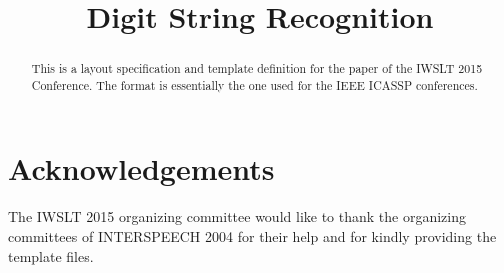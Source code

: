 \documentclass[a4paper]{article}
\title{Digit String Recognition}
\begin{document}
\maketitle
%
\begin{abstract}
This is a layout specification and template
definition for the paper of the IWSLT 2015 Conference. 
The format is essentially the one used for the IEEE ICASSP conferences.
\end{abstract}


%








\section{Acknowledgements}
The IWSLT 2015 organizing committee would like to thank the
organizing committees of INTERSPEECH 2004 for their
help and for kindly providing the template files.

%


%

\end{document}
